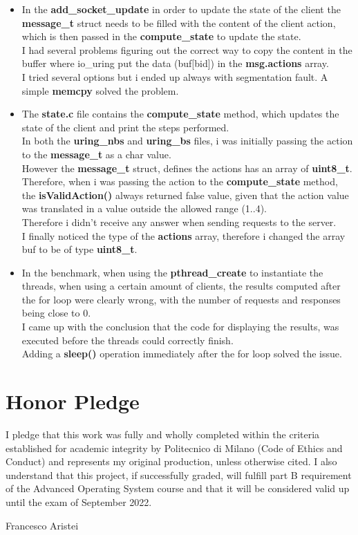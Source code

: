 \documentclass[10pt, oneside,english]{article}   	%
\begin{document}
\begin{itemize}
    \item In the \textbf{add\_socket\_update} in order to update the state of the client the \textbf{message\_t} struct needs to be filled with the content of the client action, which is then passed in the \textbf{compute\_state} to update the state. \\I had several problems figuring out the correct way to copy the content in the buffer where io\_uring put the data (buf[bid]) in the \textbf{msg.actions} array.\\ I tried several options but i ended up always with segmentation fault. A simple \textbf{memcpy} solved the problem.
    \item The \textbf{state.c} file contains the \textbf{compute\_state} method, which updates the state of the client and print the steps performed.\\ In both the \textbf{uring\_nbs} and \textbf{uring\_bs} files, i was initially passing the action to the \textbf{message\_t} as a char value. \\ However the \textbf{message\_t} struct, defines the actions has an array of \textbf{uint8\_t}.\\ Therefore, when i was passing the action to the \textbf{compute\_state} method, the \textbf{isValidAction()} always returned false value, given that the action value was translated in a value outside the allowed range (1..4).\\ Therefore i didn't receive any answer when sending requests to the server. \\ I finally noticed the type of the \textbf{actions} array, therefore i changed the array buf to be of type \textbf{uint8\_t}.
    \item In the benchmark, when using the \textbf{pthread\_create} to instantiate the threads, when using a certain amount of clients, the results computed after the for loop were clearly wrong, with the number of requests and responses being close to 0. \\ I came up with the conclusion that the code for displaying the results, was executed before the threads could correctly finish. \\ Adding a \textbf{sleep()} operation immediately after the for loop solved the issue.
    
\end{itemize}

\section{Honor Pledge}
I pledge that this work was fully and wholly completed within the criteria established for academic integrity by Politecnico di Milano
(Code of Ethics and Conduct) and represents my original production, unless otherwise cited.
I also understand that this project, if successfully graded, will fulfill part B requirement of the Advanced Operating System course
 and that it will be considered valid up until the exam of September 2022.

\begin{flushright}
        Francesco Aristei
\end{flushright}
\end{document}
